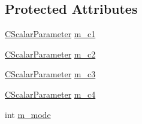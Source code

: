 \subsection*{Protected Attributes}
\begin{DoxyCompactItemize}
\item 
\hyperlink{classanl_1_1CScalarParameter}{CScalarParameter} \hyperlink{classanl_1_1CRGBACompositeChannels_a2e538a22c3b1c6eb261528649e27aa9f}{m\_\-c1}
\item 
\hyperlink{classanl_1_1CScalarParameter}{CScalarParameter} \hyperlink{classanl_1_1CRGBACompositeChannels_a1b951696321ff787040ebb87fd5272c4}{m\_\-c2}
\item 
\hyperlink{classanl_1_1CScalarParameter}{CScalarParameter} \hyperlink{classanl_1_1CRGBACompositeChannels_a748b48ef0acbad41d14b63db8edde2ce}{m\_\-c3}
\item 
\hyperlink{classanl_1_1CScalarParameter}{CScalarParameter} \hyperlink{classanl_1_1CRGBACompositeChannels_a527dafbaaeecbfd9e736c62241ce4be8}{m\_\-c4}
\item 
int \hyperlink{classanl_1_1CRGBACompositeChannels_a51db3228839a789689f2e065c40d559b}{m\_\-mode}
\end{DoxyCompactItemize}


